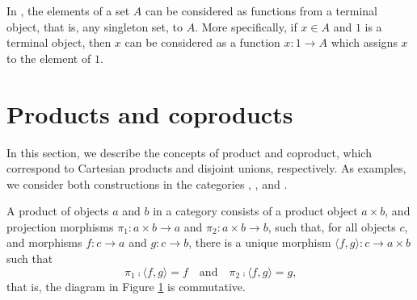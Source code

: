 \begin{example}
  \label{ex:terminal-objects-constants}


  In \set, the elements of a set $A$ can be considered as functions
  from a terminal object, that is, any singleton set, to $A$. More
  specifically, if $x \in A$ and $1$ is a terminal object, then $x$
  can be considered as a function $x: 1 \to A$ which assigns $x$ to
  the element of $1$.

\end{example}

\section{Products and coproducts}
\label{sec:constructions-products-coproducts}

In this section, we describe the concepts of product and coproduct,
which correspond to Cartesian products and disjoint unions,
respectively. As examples, we consider both constructions in the
categories \set, \hask, and \agda.

\begin{definition}
  \label{def:product}


  A product of objects $a$ and $b$ in a category  consists of a
  product object $a \times b$, and projection morphisms $\pi_{1}: a
  \times b \to a$ and $\pi_{2}: a \times b \to b$, such that, for all
  objects $c$, and morphisms $f: c \to a$ and $g: c \to b$, there is a
  unique morphism $\langle{f,g}\rangle: c \to a \times b$ such that
  \begin{equation}
    \label{eq:product}
    \pi_{1} \comp \langle{f,g}\rangle = f
    \quad
    \text{and}
    \quad
    \pi_{2} \comp \langle{f,g}\rangle = g
    \text{,}
  \end{equation}
  that is, the diagram in Figure \ref{fig:product} is commutative.

  \begin{figure}[htb]
    \begin{center}
    \end{center}
    \caption{}
    \label{fig:product}
  \end{figure}

\end{definition}

